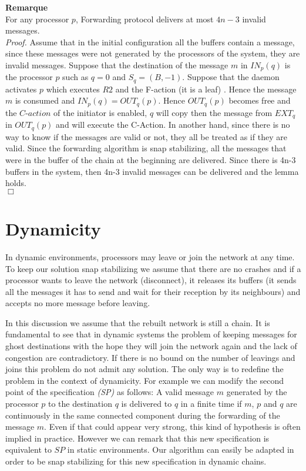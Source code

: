 \documentclass{llncs}
\renewenvironment{proof}{{\it Proof. } }{{\hfill $\Box$}\vspace{.5pc}}
\begin{document}
\textbf{Remarque}\\For any processor $p$, Forwarding protocol delivers at most $4n-3$ invalid messages.\\


\begin{proof}
Assume that in the initial configuration all the buffers contain a message, since these messages were not generated by the processors of the system, they are invalid messages. Suppose that the destination of the message $m$ in $IN_{p}(q)$ is the processor $p$ such as $q=0$ and $S_{q}=(B,-1)$. Suppose that the daemon activates $p$ which executes $R2$ and the F-action (it is a leaf) . Hence the message $m$ is consumed and $IN_{p}(q)=OUT_{q}(p)$. Hence $OUT_{q}(p)$ becomes free and the $C\mbox{-}action$ of the initiator is enabled, $q$ will copy then the message from $EXT_{q}$ in $OUT_{q}(p)$ and will execute the C-Action. In another hand, since there is no way to know if the messages are valid or not, they all be treated as if they are valid. Since the forwarding algorithm is snap stabilizing, all the messages that were in the buffer of the chain at the beginning are delivered. Since there is 4n-3 buffers in the system, then 4n-3 invalid messages can be delivered and the lemma holds. \\
\end{proof}




\section{Dynamicity\label{sec:dynamicity}}

In dynamic environments, processors may leave or join the network at any time. To keep our solution snap stabilizing we assume that there are no crashes and if a processor wants to leave the network (disconnect), it releases its buffers (it sends all the messages it has to send and wait for their reception by its neighbours) and accepts no more message before leaving.

In this discussion we assume that the rebuilt network is still a chain. It is fundamental to see that in dynamic
systems the problem of keeping messages for ghost destinations with the hope they will join the network again and the
lack of congestion are contradictory. If there is no bound on the number of leavings and joins this problem do not
admit any solution. The only way is to redefine the problem in the context of dynamicity. For example we can modify
the second point of the specification \textit{(SP)} as follows: A valid message $m$ generated by the processor $p$ to
the destination $q$ is delivered to $q$ in a finite time if $m$, $p$ and $q$ are continuously in the same connected
component during the forwarding of the message $m$. Even if that could appear very strong, this kind of hypothesis is
often implied in practice. However we can remark that this new specification is equivalent to $SP$ in static
environments. Our algorithm can easily be adapted in order to be snap stabilizing for this new specification in
dynamic chains. 
\end{document}
